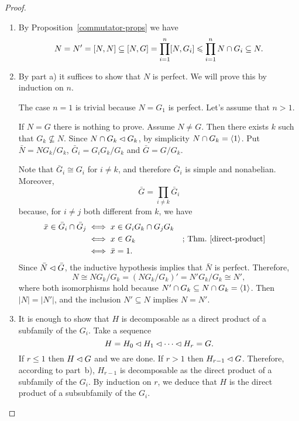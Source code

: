 \begin{proof}${}$
\begin{enumerate}[\rm a)]
    \item By Proposition~\ref{commutator-props} we have
    $$
        N=N'=[N,N]\subseteq[N,G] = \prod_{i=1}^n[N,G_i]\leqslant\prod_{i=1}^nN\cap G_i
            \subseteq N.
    $$
    \item By part a) it suffices to show that $N$ is perfect. We will prove this by induction on $n$.

    The case $n=1$ is trivial because $N=G_1$ is perfect. Let's assume that $n>1$.
    
    If $N=G$ there is nothing to prove. Assume $N\ne G$. Then there exists $k$ such that $G_k\not\subseteq N$. Since $N\cap G_k\lhd G_k$, by simplicity $N\cap G_k=\langle1\rangle$. Put $\bar N=NG_k/G_k$, $\bar G_i=G_iG_k/G_k$ and $\bar G=G/G_k$.

    Note that $\bar G_i\cong G_i$ for $i\ne k$, and therefore $\bar G_i$ is simple and nonabelian. Moreover,
    $$
        \bar G = \prod_{i\ne k}\bar G_i
    $$
    because, for $i\ne j$ both different from $k$, we have
    \begin{align*}
        \bar x\in \bar G_i\cap \bar G_j &\iff x\in G_iG_k\cap G_jG_k\\
            &\iff x\in G_k   &&\text{; Thm.~\ref{direct-product}}\\
            &\iff \bar x= 1.
    \end{align*}
    Since $\bar N\lhd\bar G$, the inductive hypothesis implies that $\bar N$ is perfect. Therefore,
    $$
        N\cong NG_k/G_k = (NG_k/G_k)' = N'G_k/G_k \cong N',
    $$
    where both isomorphisms hold because $N'\cap G_k\subseteq N\cap G_k=\langle1\rangle$. Then $|N|=|N'|$, and the inclusion $N'\subseteq N$ implies $N=N'$.

    \item It is enough to show that $H$ is decomposable as a direct product of a subfamily of the $G_i$. Take a sequence
    $$
        H=H_0\lhd H_1\lhd\cdots\lhd H_r=G.
    $$
    If $r\le 1$ then $H\lhd G$ and we are done. If $r>1$ then $H_{r-1}\lhd G$. Therefore, according to part~b), $H_{r-1}$ is decomposable as the direct product of a subfamily of the $G_i$. By induction on $r$, we deduce that $H$ is the direct product of a subsubfamily of the $G_i$.
\end{enumerate}
\end{proof}

